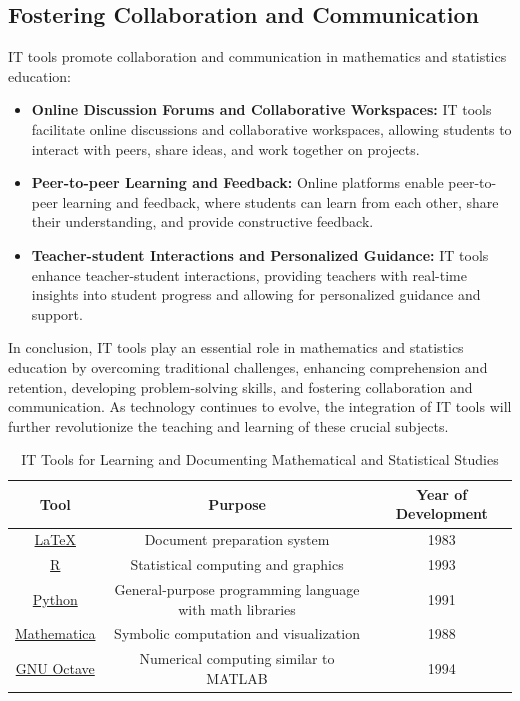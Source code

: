 \documentclass[20pt]{report}
\begin{document}
\subsection{Fostering Collaboration and Communication}

IT tools promote collaboration and communication in mathematics and statistics education:

\begin{itemize}

\item \textbf{Online Discussion Forums and Collaborative Workspaces:} IT tools facilitate online discussions and collaborative workspaces, allowing students to interact with peers, share ideas, and work together on projects.

\item \textbf{Peer-to-peer Learning and Feedback:} Online platforms enable peer-to-peer learning and feedback, where students can learn from each other, share their understanding, and provide constructive feedback.

\item \textbf{Teacher-student Interactions and Personalized Guidance:} IT tools enhance teacher-student interactions, providing teachers with real-time insights into student progress and allowing for personalized guidance and support.

\end{itemize}

In conclusion, IT tools play an essential role in mathematics and statistics education by overcoming traditional challenges, enhancing comprehension and retention, developing problem-solving skills, and fostering collaboration and communication. As technology continues to evolve, the integration of IT tools will further revolutionize the teaching and learning of these crucial subjects.\\


\begin{table}
    \centering
    \begin{tabular}{|c|c|c|}
        \hline
        \textbf{Tool} & \textbf{Purpose} & \textbf{Year of Development} \\
        \hline
        \href{https://www.latex-project.org/}{\LaTeX} & Document preparation system & 1983 \\
        \hline
        \href{https://www.r-project.org/}{R} & Statistical computing and graphics & 1993 \\
        \hline
        \href{https://www.python.org/}{Python} & General-purpose programming language with math libraries & 1991 \\
        \hline
        \href{https://www.wolfram.com/mathematica/}{Mathematica} & Symbolic computation and visualization & 1988 \\
        \hline
        \href{https://www.gnu.org/software/octave/}{GNU Octave} & Numerical computing similar to MATLAB & 1994 \\
        \hline
    \end{tabular}
    \caption{IT Tools for Learning and Documenting Mathematical and Statistical Studies}
    \label{tab:it_tools}
\end{table}
\end{document}
